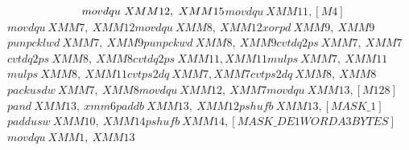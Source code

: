 	$\hspace*{2.3cm}movdqu\ XMM12,\ XMM15$\newline$
		$\hspace*{2.8cm}$movdqu\ XMM11, [M4]$\newline$
		$\hspace*{2.8cm}$movdqu\ XMM7,\ XMM12$\newline$
		$\hspace*{2.8cm}$movdqu\ XMM8,\ XMM12$\newline$
		$\hspace*{2.8cm}$xorpd\ XMM9,\ XMM9$\newline$
		$\hspace*{2.8cm}$punpcklwd\ XMM7,\ XMM9$\newline$
		$\hspace*{2.8cm}$punpckwd\ XMM8,\ XMM9$\newline$
		$\hspace*{2.8cm}$cvtdq2ps\ XMM7,\ XMM7$\newline$
$\hspace*{2.8cm}$		cvtdq2ps\ XMM8,\ XMM8$\newline$
		$\hspace*{2.8cm}$cvtdq2ps\ XMM11,XMM11$\newline$
		$\hspace*{2.8cm}$mulps\ XMM7,\ XMM11$\newline$
		$\hspace*{2.8cm}$mulps\ XMM8,\ XMM11$\newline$
		$\hspace*{2.8cm}$cvtps2dq\ XMM7,XMM7$\newline$
		$\hspace*{2.8cm}$cvtps2dq\ XMM8,\ XMM8$\newline$
		$\hspace*{2.8cm}$packusdw\ XMM7,\ XMM8$\newline$
		$\hspace*{2.8cm}$movdqu\ XMM12,\ XMM7$\newline$
		$\hspace*{2.8cm}$movdqu\ XMM13, [M128]$\newline$
		$\hspace*{2.8cm}$pand\ XMM13,\ xmm6  $\newline$
		$\hspace*{2.8cm}$paddb\ XMM13,\ XMM12 $\newline$
		$\hspace*{2.8cm}$pshufb\ XMM13, [MASK\_1]  $\newline$
		$\hspace*{2.8cm}$paddusw\ XMM10,\ XMM14  $\newline$
		$\hspace*{2.8cm}$pshufb\ XMM14, [MASK\_DE1WORDA3BYTES]$\newline$
		$\hspace*{2.8cm}$movdqu\ XMM1,\ XMM13$\newline

